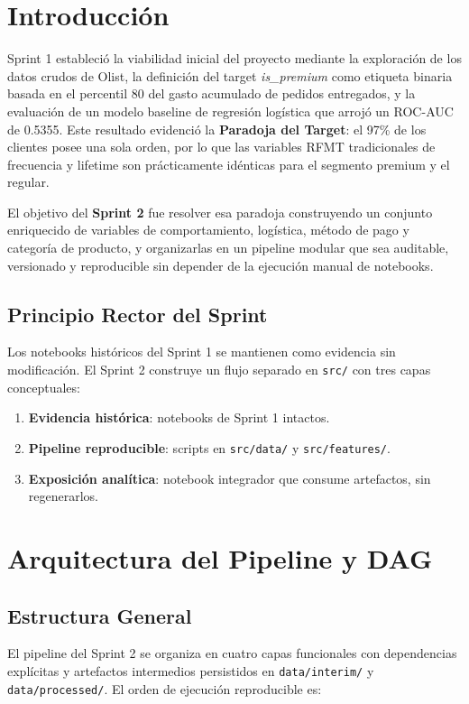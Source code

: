 \documentclass[journal,letterpaper]{IEEEtran}
\begin{document}
\section{Introducción}
 Sprint 1 estableció la viabilidad inicial del proyecto mediante la exploración de los datos crudos de Olist, la definición del target \textit{is\_premium} como etiqueta binaria basada en el percentil 80 del gasto acumulado de pedidos entregados, y la evaluación de un modelo baseline de regresión logística que arrojó un ROC-AUC de 0.5355. Este resultado evidenció la \textbf{Paradoja del Target}: el 97\% de los clientes posee una sola orden, por lo que las variables RFMT tradicionales de frecuencia y lifetime son prácticamente idénticas para el segmento premium y el regular.

El objetivo del \textbf{Sprint 2} fue resolver esa paradoja construyendo un conjunto enriquecido de variables de comportamiento, logística, método de pago y categoría de producto, y organizarlas en un pipeline modular que sea auditable, versionado y reproducible sin depender de la ejecución manual de notebooks.

\subsection{Principio Rector del Sprint}
Los notebooks históricos del Sprint 1 se mantienen como evidencia sin modificación. El Sprint 2 construye un flujo separado en \texttt{src/} con tres capas conceptuales:
\begin{enumerate}
    \item \textbf{Evidencia histórica}: notebooks de Sprint 1 intactos.
    \item \textbf{Pipeline reproducible}: scripts en \texttt{src/data/} y \texttt{src/features/}.
    \item \textbf{Exposición analítica}: notebook integrador que consume artefactos, sin regenerarlos.
\end{enumerate}

\section{Arquitectura del Pipeline y DAG}
\subsection{Estructura General}
El pipeline del Sprint 2 se organiza en cuatro capas funcionales con dependencias explícitas y artefactos intermedios persistidos en \texttt{data/interim/} y \texttt{data/processed/}. El orden de ejecución reproducible es:
\end{document}
